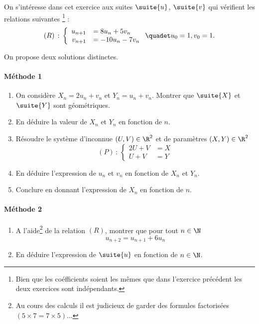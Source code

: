 \documentclass[a4paper, 11pt,reqno]{article}
\begin{document}
\vspace{1cm}
\begin{exercice}
On s'intéresse dans cet exercice aux suites $\suite{u}$, $\suite{v}$ qui vérifient les relations suivantes \footnote{Bien que les coéfficients soient les mêmes que dans l'exercice précédent les deux exercices sont indépendants. } : 
$$(R)\, :\, \left\{\begin{array}{rl}
u_{n+1} &=8u_n +5v_n\\
v_{n+1}&= -10u_n-7v_n
\end{array}\right. \quadet u_0=1, v_0=1.$$

On propose deux solutions distinctes. 

\paragraph{Méthode 1}
\begin{enumerate}

\item On considère $X_n = 2u_n+v_n$ et $Y_n=u_n+v_n$.
Montrer que $\suite{X}$ et $\suite{Y}$ sont géométriques. 
\item En déduire la valeur de $X_n$ et $Y_n$ en fonction de $n$. 

\item Résoudre le système d'inconnue $(U,V)\in \R^2$ et de paramètres $(X,Y)\in \R^2$ 
$$(P)\,:\, \left\{\begin{array}{rl}
2U +V&=X\\
U+V&=Y
\end{array}\right.$$

\item En déduire l'expression de $u_n$ et $v_n$ en fonction de $X_n$ et $Y_n$. 
\item Conclure en donnant l'expression de $X_n$ en fonction de $n$.
\end{enumerate}
\paragraph{Méthode 2 }
\begin{enumerate}
\item A l'aide\footnote{Au cours des calculs il est judicieux de garder des formules factorisées $(5\times 7= 7\times 5)$... } de la relation $(R)$, montrer que pour tout $n\in \N$ 
$$u_{n+2}=u_{n+1}+6u_n$$
\item En déduire l'expression de $\suite{u}$ en fonction de $n\in \N$. 
\end{enumerate}
\end{exercice}
\end{document}
